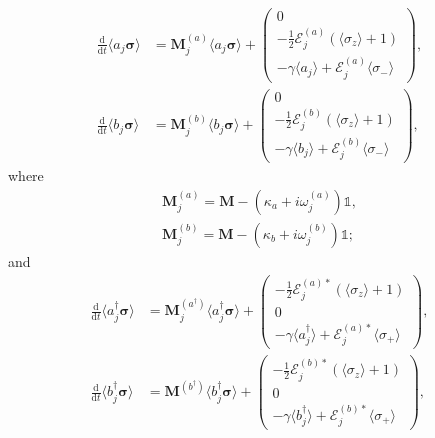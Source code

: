 \documentclass{article}
\newcommand{\ddt}[1][]{\frac{\mathrm{d} #1}{\mathrm{d}t}}
\begin{document}
\begin{subequations}
	\begin{align}
		\ddt \langle a_{j} \bm{\sigma} \rangle &= \bm{M}_{j}^{(a)} \langle a_{j} \bm{\sigma} \rangle + 
		\begin{pmatrix}
			0 \\
			-\frac{1}{2} \mathcal{E}_{j}^{(a)} \left( \langle \sigma_{z} \rangle + 1 \right) \\
			-\gamma \langle a_{j} \rangle + \mathcal{E}_{j}^{(a)} \langle \sigma_{-} \rangle
		\end{pmatrix}, \\
		\ddt \langle b_{j} \bm{\sigma} \rangle &= \bm{M}_{j}^{(b)} \langle b_{j} \bm{\sigma} \rangle + 
		\begin{pmatrix}
			0 \\
			-\frac{1}{2} \mathcal{E}_{j}^{(b)} \left( \langle \sigma_{z} \rangle + 1 \right) \\
			-\gamma \langle b_{j} \rangle + \mathcal{E}_{j}^{(b)} \langle \sigma_{-} \rangle
		\end{pmatrix},
	\end{align}
\end{subequations}
where
\begin{subequations}
	\begin{gather}
		\bm{M}_{j}^{(a)} = \bm{M} - \left( \kappa_{a} + i \omega_{j}^{(a)} \right) \mathbb{1}, \\
		\bm{M}_{j}^{(b)} = \bm{M} - \left( \kappa_{b} + i \omega_{j}^{(b)} \right) \mathbb{1};
	\end{gather}
\end{subequations}
and
\begin{subequations}
	\begin{align}
		\ddt \langle a^{\dagger}_{j} \bm{\sigma} \rangle &= \bm{M}_{j}^{(a^{\dagger})} \langle a^{\dagger}_{j} \bm{\sigma} \rangle + 
		\begin{pmatrix}
			-\frac{1}{2} \mathcal{E}_{j}^{(a) *} \left( \langle \sigma_{z} \rangle + 1 \right) \\
			0 \\
			-\gamma \langle a^{\dagger}_{j} \rangle + \mathcal{E}_{j}^{(a) *} \langle \sigma_{+} \rangle
		\end{pmatrix}, \\
		\ddt \langle b^{\dagger}_{j} \bm{\sigma} \rangle &= \bm{M}_{}^{(b^{\dagger})} \langle b^{\dagger}_{j} \bm{\sigma} \rangle + 
		\begin{pmatrix}
			-\frac{1}{2} \mathcal{E}_{j}^{(b) *} \left( \langle \sigma_{z} \rangle + 1 \right) \\
			0 \\
			-\gamma \langle b^{\dagger}_{j} \rangle + \mathcal{E}_{j}^{(b) *} \langle \sigma_{+} \rangle
		\end{pmatrix},
	\end{align}
\end{subequations}
\end{document}
